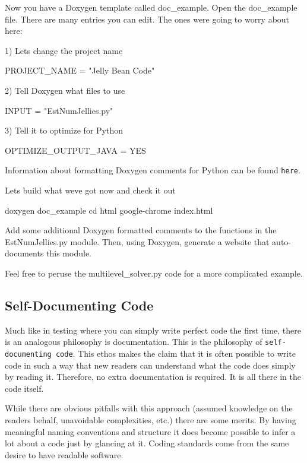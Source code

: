 Now you have a Doxygen template called doc\+\_\+example. Open the doc\+\_\+example file. There are many entries you can edit. The ones we\textquotesingle{}re going to worry about here\+:

1) Let\textquotesingle{}s change the project name \begin{DoxyVerb} PROJECT_NAME           = "Jelly Bean Code"
\end{DoxyVerb}


2) Tell Doxygen what files to use \begin{DoxyVerb} INPUT                  =  "EstNumJellies.py"
\end{DoxyVerb}


3) Tell it to optimize for Python \begin{DoxyVerb} OPTIMIZE_OUTPUT_JAVA   = YES
\end{DoxyVerb}


Information about formatting Doxygen comments for Python can be found {\tt here}.

Let\textquotesingle{}s build what we\textquotesingle{}ve got now and check it out \begin{DoxyVerb} doxygen doc_example
 cd html
 google-chrome index.html
\end{DoxyVerb}


Add some additional Doxygen formatted comments to the functions in the {\ttfamily Est\+Num\+Jellies.\+py} module. Then, using Doxygen, generate a website that auto-\/documents this module.

Feel free to peruse the multilevel\+\_\+solver.\+py code for a more complicated example.

\subsection*{Self-\/\+Documenting Code}

Much like in testing where you can simply write perfect code the first time, there is an analogous philosophy is documentation. This is the philosophy of {\tt self-\/documenting code}. This ethos makes the claim that it is often possible to write code in such a way that new readers can understand what the code does simply by reading it. Therefore, no extra documentation is required. It is all there in the code itself.

While there are obvious pitfalls with this approach (assumed knowledge on the reader\textquotesingle{}s behalf, unavoidable complexities, etc.) there are some merits. By having meaningful naming conventions and structure it does become possible to infer a lot about a code just by glancing at it. Coding standards come from the same desire to have readable software.

